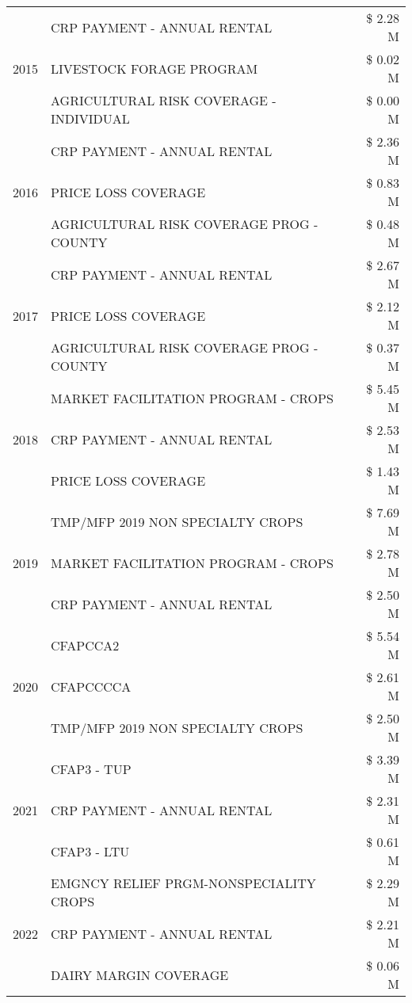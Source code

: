 \begin{tabular}{llr}
\multirow[t]{3}{*}{2015} & CRP PAYMENT - ANNUAL RENTAL & \$ 2.28 M \\
 & LIVESTOCK FORAGE PROGRAM & \$ 0.02 M \\
 & AGRICULTURAL RISK COVERAGE - INDIVIDUAL & \$ 0.00 M \\
\cline{1-3}
\multirow[t]{3}{*}{2016} & CRP PAYMENT - ANNUAL RENTAL & \$ 2.36 M \\
 & PRICE LOSS COVERAGE & \$ 0.83 M \\
 & AGRICULTURAL RISK COVERAGE PROG - COUNTY & \$ 0.48 M \\
\cline{1-3}
\multirow[t]{3}{*}{2017} & CRP PAYMENT - ANNUAL RENTAL & \$ 2.67 M \\
 & PRICE LOSS COVERAGE & \$ 2.12 M \\
 & AGRICULTURAL RISK COVERAGE PROG - COUNTY & \$ 0.37 M \\
\cline{1-3}
\multirow[t]{3}{*}{2018} & MARKET FACILITATION PROGRAM - CROPS & \$ 5.45 M \\
 & CRP PAYMENT - ANNUAL RENTAL & \$ 2.53 M \\
 & PRICE LOSS COVERAGE & \$ 1.43 M \\
\cline{1-3}
\multirow[t]{3}{*}{2019} & TMP/MFP 2019 NON SPECIALTY CROPS & \$ 7.69 M \\
 & MARKET FACILITATION PROGRAM - CROPS & \$ 2.78 M \\
 & CRP PAYMENT - ANNUAL RENTAL & \$ 2.50 M \\
\cline{1-3}
\multirow[t]{3}{*}{2020} & CFAPCCA2 & \$ 5.54 M \\
 & CFAPCCCCA & \$ 2.61 M \\
 & TMP/MFP 2019 NON SPECIALTY CROPS & \$ 2.50 M \\
\cline{1-3}
\multirow[t]{3}{*}{2021} & CFAP3 - TUP & \$ 3.39 M \\
 & CRP PAYMENT - ANNUAL RENTAL & \$ 2.31 M \\
 & CFAP3 - LTU & \$ 0.61 M \\
\cline{1-3}
\multirow[t]{3}{*}{2022} & EMGNCY RELIEF PRGM-NONSPECIALITY CROPS & \$ 2.29 M \\
 & CRP PAYMENT - ANNUAL RENTAL & \$ 2.21 M \\
 & DAIRY MARGIN COVERAGE & \$ 0.06 M \\
\cline{1-3}
\bottomrule
\end{tabular}
